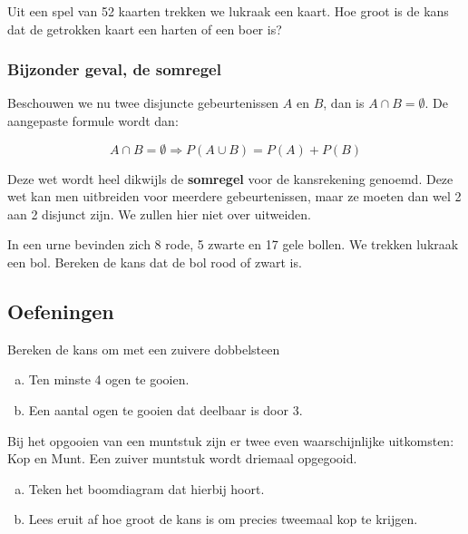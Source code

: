 \documentclass[12pt,twoside]{article}
\begin{document}
\begin{oefening}
Uit een spel van 52 kaarten trekken we lukraak een kaart. Hoe groot is de kans dat de
getrokken kaart een harten of een boer is?
\end{oefening}

\subsubsection{Bijzonder geval, de somregel}
Beschouwen we nu twee disjuncte gebeurtenissen $A$ en $B$, dan is $A \cap B = \emptyset$.
De aangepaste formule wordt dan:\\
\begin{mdframed}
$$A \cap B = \emptyset \Rightarrow P(A\cup B)=P(A)+P(B)$$
\end{mdframed}
Deze wet wordt heel dikwijls de {\bf somregel} voor de kansrekening genoemd. Deze wet
kan men uitbreiden voor meerdere gebeurtenissen, maar ze moeten dan wel 2 aan 2
disjunct zijn. We zullen hier niet over uitweiden.

\begin{oefening}
In een urne bevinden zich 8 rode, 5 zwarte en 17 gele bollen. We trekken lukraak een
bol. Bereken de kans dat de bol rood of zwart is.
\end{oefening}

\subsection{Oefeningen}

\begin{oefening}
Bereken de kans om met een zuivere dobbelsteen
\begin{enumerate}[(a)]
  \item Ten minste 4 ogen te gooien.
  \item Een aantal ogen te gooien dat deelbaar is door 3.
\end{enumerate}
\end{oefening}

\begin{oefening}
Bij het opgooien van een muntstuk zijn er twee even waarschijnlijke uitkomsten: Kop en Munt. Een zuiver muntstuk wordt driemaal opgegooid.
\begin{enumerate}[(a)]
  \item Teken het boomdiagram dat hierbij hoort.
  \item Lees eruit af hoe groot de kans is om precies tweemaal kop te krijgen.
\end{enumerate}
\end{oefening}
\end{document}
